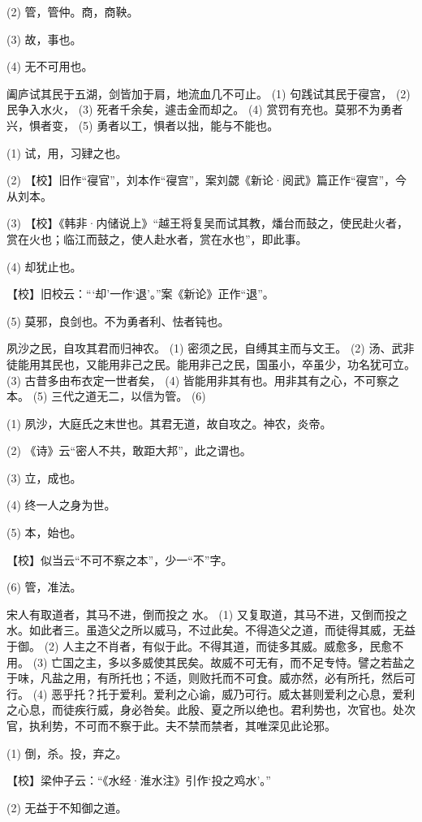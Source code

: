 \documentclass[12pt,UTF8]{ctexbook}
\begin{document}
(2) 管，管仲。商，商鞅。

(3) 故，事也。

(4) 无不可用也。

阖庐试其民于五湖，剑皆加于肩，地流血几不可止。 (1) 句践试其民于寑宫， (2) 民争入水火， (3) 死者千余矣，遽击金而却之。 (4) 赏罚有充也。莫邪不为勇者兴，惧者变， (5) 勇者以工，惧者以拙，能与不能也。

(1) 试，用，习肄之也。

(2) 【校】旧作“寑官”，刘本作“寑宫”，案刘勰《新论·阅武》篇正作“寑宫”，今从刘本。

(3) 【校】《韩非·内储说上》“越王将复吴而试其教，燔台而鼓之，使民赴火者，赏在火也；临江而鼓之，使人赴水者，赏在水也”，即此事。

(4) 却犹止也。

【校】旧校云：“‘却’一作‘退’。”案《新论》正作“退”。

(5) 莫邪，良剑也。不为勇者利、怯者钝也。

夙沙之民，自攻其君而归神农。 (1) 密须之民，自缚其主而与文王。 (2) 汤、武非徒能用其民也，又能用非己之民。能用非己之民，国虽小，卒虽少，功名犹可立。 (3) 古昔多由布衣定一世者矣， (4) 皆能用非其有也。用非其有之心，不可察之本。 (5) 三代之道无二，以信为管。 (6)

(1) 夙沙，大庭氏之末世也。其君无道，故自攻之。神农，炎帝。

(2) 《诗》云“密人不共，敢距大邦”，此之谓也。

(3) 立，成也。

(4) 终一人之身为世。

(5) 本，始也。

【校】似当云“不可不察之本”，少一“不”字。

(6) 管，准法。

宋人有取道者，其马不进，倒而投之 水。 (1) 又复取道，其马不进，又倒而投之 水。如此者三。虽造父之所以威马，不过此矣。不得造父之道，而徒得其威，无益于御。 (2) 人主之不肖者，有似于此。不得其道，而徒多其威。威愈多，民愈不用。 (3) 亡国之主，多以多威使其民矣。故威不可无有，而不足专恃。譬之若盐之于味，凡盐之用，有所托也；不适，则败托而不可食。威亦然，必有所托，然后可行。 (4) 恶乎托？托于爱利。爱利之心谕，威乃可行。威太甚则爱利之心息，爱利之心息，而徒疾行威，身必咎矣。此殷、夏之所以绝也。君利势也，次官也。处次官，执利势，不可而不察于此。夫不禁而禁者，其唯深见此论邪。

(1) 倒，杀。投，弃之。

【校】梁仲子云：“《水经·淮水注》引作‘投之鸡水’。”

(2) 无益于不知御之道。
\end{document}
